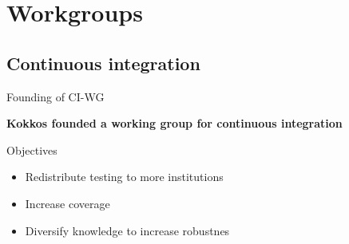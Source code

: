\section{Workgroups}

\subsection{Continuous integration}


\begin{frame}[fragile]{Founding of CI-WG}
  \begin{center}
\textbf{Kokkos founded a working group for continuous integration}
\vspace{1cm}
  \end{center}

    Objectives
    \begin{itemize}
      \item{Redistribute testing to more institutions}
      \item{Increase coverage}
      \item{Diversify knowledge to increase robustnes}
    \end{itemize}

\end{frame}

